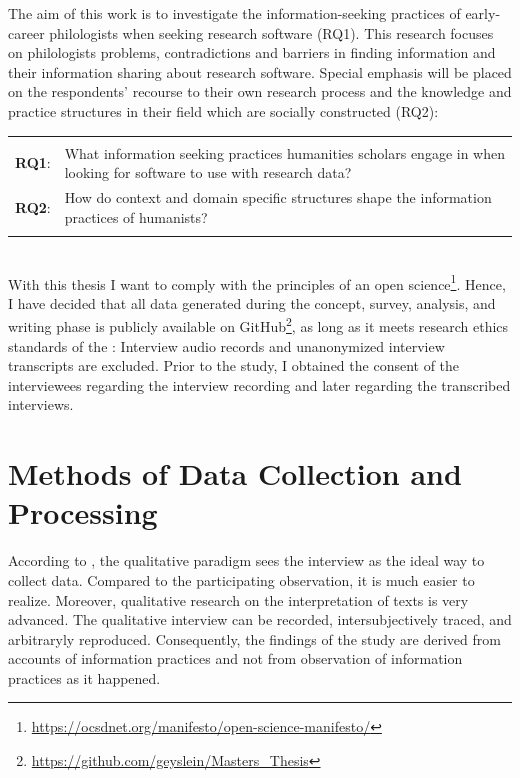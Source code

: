 \documentclass[12pt, a4paper, titlepage, oneside, abstract=true, toc=listof, toc=bibliography, BCOR=1cm]{scrreprt}
\begin{document}
The aim of this work is to investigate the information-seeking practices of early-career philologists when seeking research software (RQ1). This research focuses on philologists problems, contradictions and barriers in finding information and their information sharing about research software. Special emphasis will be placed on the respondents' recourse to their own research process and the knowledge and practice structures in their field \citep{Hjorland1995} which are socially constructed (RQ2):

\begin{tabular}{p{2cm}p{11.75cm}}
& \\
\textbf{RQ1}: & What information seeking practices humanities scholars engage in when looking for software to use with research data?\\ 
\textbf{RQ2}: & How do context and domain specific structures shape the information practices of humanists?\\ 
& \\
\end{tabular}\\  

With this thesis I want to comply with the principles of an open science\footnote{\url{https://ocsdnet.org/manifesto/open-science-manifesto/}}. Hence, I have decided that all data generated during the concept, survey, analysis, and writing phase is publicly available on GitHub\footnote{\url{https://github.com/geyslein/Masters_Thesis}}, as long as it meets research ethics standards of the \citet{DeutscheForschungsgemeinschaft2019}: Interview audio records and unanonymized interview transcripts are excluded. Prior to the study, I obtained the consent of the interviewees regarding the interview recording and later regarding the transcribed interviews.

\section{Methods of Data Collection and Processing}
\label{sec:data_collection}
According to \citet[p. 329]{Lamnek2005}, the qualitative paradigm sees the interview as the ideal way to collect data. Compared to the participating observation, it is much easier to realize. Moreover, qualitative research on the interpretation of texts is very advanced. The qualitative interview can be recorded, intersubjectively traced, and arbitraryly reproduced. Consequently, the findings of the study are derived from accounts of information practices and not from observation of information practices as it happened. 
\end{document}
